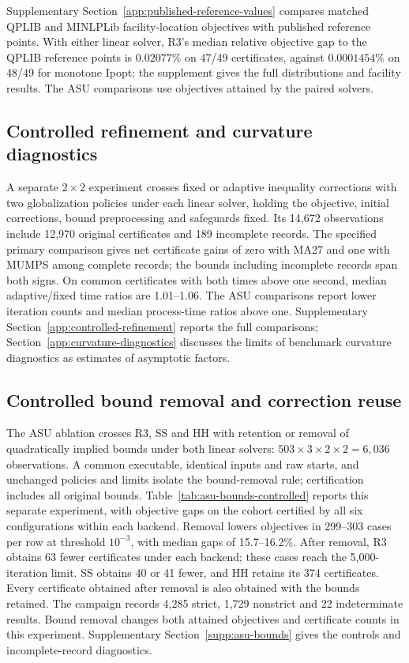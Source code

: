 \documentclass[pdflatex,sn-mathphys-num]{sn-jnl}
\theoremstyle{thmstyleone}
\theoremstyle{thmstylethree}
\begin{document}
Supplementary Section~\ref{app:published-reference-values} compares matched
QPLIB and MINLPLib facility-location objectives with published reference
points. With either linear solver,
R3's median relative objective gap to the QPLIB reference points is $0.02077\%$ on 47/49 certificates, against
$0.0001454\%$ on 48/49 for monotone Ipopt; the supplement gives the full
distributions and facility results. The ASU comparisons use objectives
attained by the paired solvers.

\subsection{Controlled refinement and curvature diagnostics}
A separate $2\times2$ experiment crosses fixed or adaptive inequality
corrections with two globalization policies under each linear solver,
holding the objective, initial corrections, bound preprocessing and
safeguards fixed. Its 14,672 observations include 12,970 original
certificates and 189 incomplete records. The specified primary comparison
gives net certificate gains of zero with MA27 and one with MUMPS among
complete records; the bounds including incomplete records span both signs.
On common certificates with both times above one second, median
adaptive/fixed time ratios are 1.01--1.06. The ASU comparisons report
lower iteration counts and median process-time ratios above one. Supplementary
Section~\ref{app:controlled-refinement} reports the full comparisons;
Section~\ref{app:curvature-diagnostics} discusses the limits of benchmark
curvature diagnostics as estimates of asymptotic factors.

\subsection{Controlled bound removal and correction reuse}\label{sec:bounds-persistence}
The ASU ablation crosses R3, SS and HH with retention or removal of
quadratically implied bounds under both linear solvers: $503\times3\times2
\times2=6{,}036$ observations. A common executable, identical inputs and
raw starts, and unchanged policies and limits isolate the bound-removal
rule; certification includes all original bounds. Table~\ref{tab:asu-bounds-controlled}
reports this separate experiment, with objective gaps on the cohort
certified by all six configurations within each backend. Removal lowers
objectives in 299--303 cases per row at threshold $10^{-3}$, with median
gaps of 15.7--16.2\%. After removal, R3 obtains 63 fewer certificates under each backend;
these cases reach the 5,000-iteration limit. SS obtains 40 or 41 fewer,
and HH retains its 374 certificates. Every certificate obtained after
removal is also obtained with the bounds retained. The campaign records
4,285 strict, 1,729 nonstrict and 22 indeterminate results. Bound removal
changes both attained objectives and certificate counts in this experiment. Supplementary Section~\ref{supp:asu-bounds}
gives the controls and incomplete-record diagnostics.
\end{document}
